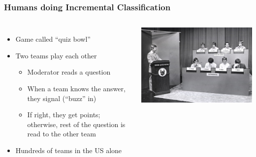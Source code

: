 \documentclass[xcolor=dvipsnames]{beamer}
\begin{document}
\begin{frame}
	\frametitle{Humans doing Incremental Classification}
	\begin{columns}

	\begin{itemize}
		\item Game called ``quiz bowl''
		\item Two teams play each other
		\begin{itemize}
			\item Moderator reads a question
			\item When a team knows the answer, they signal (``buzz'' in)
			\item If right, they get points; otherwise, rest of the question is read to the other team
		\end{itemize}
		\item Hundreds of teams in the US alone
	\end{itemize}

	\includegraphics{qb/quizbowl}

	\end{columns}

\end{frame}
\end{document}
